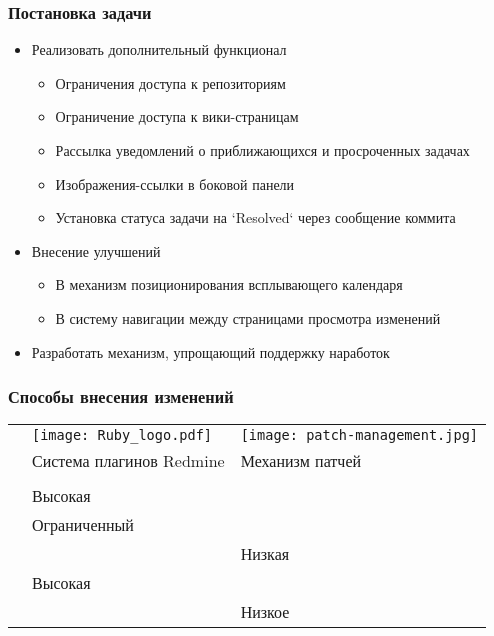 \documentclass[unicode]{beamer}
\begin{document}
\begin{frame}
\transwipe[direction=90]
\frametitle{Постановка задачи}
\begin{block}{}
\begin{itemize}
  \item Реализовать дополнительный функционал
  \begin{itemize}
    \item Ограничения доступа к репозиториям
    \item Ограничение доступа к вики-страницам
    \item Рассылка уведомлений о приближающихся и просроченных задачах
    \item Изображения-ссылки в боковой панели
    \item Установка статуса задачи на `Resolved` через сообщение коммита
  \end{itemize}
  \item Внесение улучшений
  \begin{itemize}
    \item В механизм позиционирования всплывающего календаря
    \item В систему навигации между страницами просмотра изменений
  \end{itemize}
  \item Разработать механизм, упрощающий поддержку наработок
\end{itemize}
\end{block}
\end{frame}


\begin{frame}
\transwipe[direction=90]
\frametitle{Способы внесения изменений}
\begin{tabular}{ >{\centering\arraybackslash}m{}  >{\centering\arraybackslash}m{}
>{\centering\arraybackslash}m{}}

&\texttt{[image: Ruby\_logo.pdf]}&\texttt{[image: patch-management.jpg]}\\
& Система плагинов Redmine & Механизм патчей\\
&&\\
\hline
\color{blue}{Сложность разработки} & Высокая & \color{red}{Низкая} \\
\hline
\color{blue}{Спектр решаемых задач} & Ограниченный & \color{red}{Максимальный}\\
\hline
\color{blue}{Устойчивость к обновлениям системы} & \color{red}{Высокая} & Низкая \\
\hline
\color{blue}{Стоимость внесения изменений} & Высокая & \color{red}{Средняя} \\
\hline
\color{blue}{Удобство распространения} & \color{red}{Высокое} & Низкое \\
\hline
\end{tabular}
\end{frame}
\end{document}
